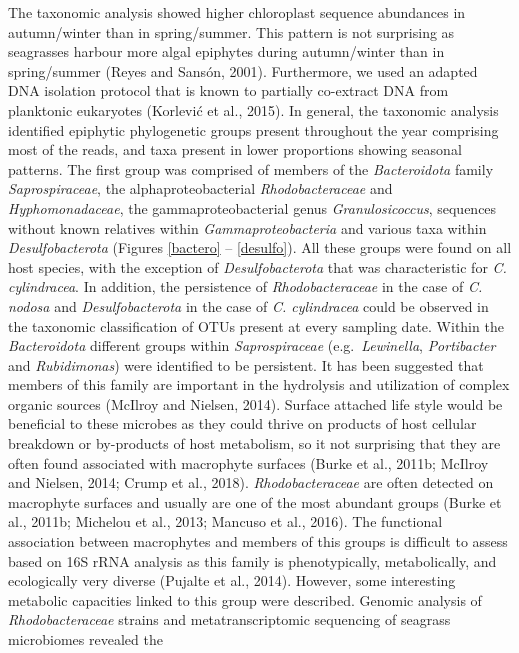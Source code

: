 \documentclass[
  12pt,
]{article}
\begin{document}
The taxonomic analysis showed higher chloroplast sequence abundances in
autumn/winter than in spring/summer. This pattern is not surprising as
seagrasses harbour more algal epiphytes during autumn/winter than in
spring/summer (Reyes and Sansón, 2001). Furthermore, we used an adapted
DNA isolation protocol that is known to partially co-extract DNA from
planktonic eukaryotes (Korlević et al., 2015). In general, the taxonomic
analysis identified epiphytic phylogenetic groups present throughout the
year comprising most of the reads, and taxa present in lower proportions
showing seasonal patterns. The first group was comprised of members of
the \emph{Bacteroidota} family \emph{Saprospiraceae}, the
alphaproteobacterial \emph{Rhodobacteraceae} and \emph{Hyphomonadaceae},
the gammaproteobacterial genus \emph{Granulosicoccus}, sequences without
known relatives within \emph{Gammaproteobacteria} and various taxa
within \emph{Desulfobacterota} (Figures \ref{bactero} -- \ref{desulfo}).
All these groups were found on all host species, with the exception of
\emph{Desulfobacterota} that was characteristic for \emph{C.
cylindracea}. In addition, the persistence of \emph{Rhodobacteraceae} in
the case of \emph{C. nodosa} and \emph{Desulfobacterota} in the case of
\emph{C. cylindracea} could be observed in the taxonomic classification
of OTUs present at every sampling date. Within the \emph{Bacteroidota}
different groups within \emph{Saprospiraceae} (e.g.~\emph{Lewinella},
\emph{Portibacter} and \emph{Rubidimonas}) were identified to be
persistent. It has been suggested that members of this family are
important in the hydrolysis and utilization of complex organic sources
(McIlroy and Nielsen, 2014). Surface attached life style would be
beneficial to these microbes as they could thrive on products of host
cellular breakdown or by-products of host metabolism, so it not
surprising that they are often found associated with macrophyte surfaces
(Burke et al., 2011b; McIlroy and Nielsen, 2014; Crump et al., 2018).
\emph{Rhodobacteraceae} are often detected on macrophyte surfaces and
usually are one of the most abundant groups (Burke et al., 2011b;
Michelou et al., 2013; Mancuso et al., 2016). The functional association
between macrophytes and members of this groups is difficult to assess
based on 16S rRNA analysis as this family is phenotypically,
metabolically, and ecologically very diverse (Pujalte et al., 2014).
However, some interesting metabolic capacities linked to this group were
described. Genomic analysis of \emph{Rhodobacteraceae} strains and
metatranscriptomic sequencing of seagrass microbiomes revealed the
\end{document}
